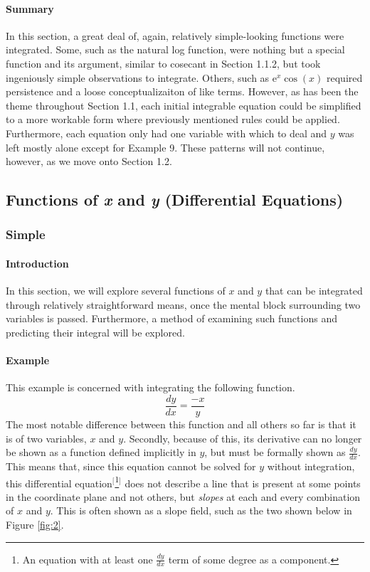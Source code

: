 \documentclass{article}
\newcounter{example}%
\newcommand{\ex}{\stepcounter{example} \paragraph{Example \theexample}}
\begin{document}
\paragraph{Summary} In this section, a great deal of, again, relatively simple-looking functions were integrated. Some, such as the natural log function, were nothing but a special function and its argument, similar to cosecant in Section 1.1.2, but took ingeniously simple observations to integrate. Others, such as $\text{e}^x\cos(x)$ required persistence and a loose conceptualizaiton of like terms. However, as has been the theme throughout Section 1.1, each initial integrable equation could be simplified to a more workable form where previously mentioned rules could be applied. Furthermore, each equation only had one variable with which to deal and $y$ was left mostly alone except for Example 9. These patterns will not continue, however, as we move onto Section 1.2.
\newpage


\subsection{Functions of \emph{x} and \emph{y} (Differential Equations)}
\subsubsection{Simple}
\paragraph{Introduction} In this section, we will explore several functions of $x$ and $y$ that can be integrated through relatively straightforward means, once the mental block surrounding two variables is passed. Furthermore, a method of examining such functions and predicting their integral will be explored.
\ex This example is concerned with integrating the following function.$$\frac{dy}{dx}=\frac{-x}{y}$$
The most notable difference between this function and all others so far is that it is of two variables, $x$ and $y$. Secondly, because of this, its derivative can no longer be shown as a function defined implicitly in $y$, but must be formally shown as $\tfrac{dy}{dx}$. This means that, since this equation cannot be solved for $y$ without integration, this differential equation$^[$\footnote{An equation with at least one $\frac{dy}{dx}$ term of some degree as a component.}$^]$ does not describe a line that is present at some points in the coordinate plane and not others, but \emph{slopes} at each and every combination of $x$ and $y$. This is often shown as a slope field, such as the two shown below in Figure \ref{fig:2}.
\end{document}
